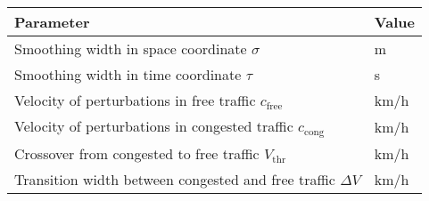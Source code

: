 \documentclass[portrait, a0, final]{a0poster}
\begin{document}
\sf
\normalsize
\begin{minipage}{35cm}
\textcolor{webfontcolor}{
\begin{tabular}{ll}
\toprule Parameter & Value\\ 
\midrule 
Smoothing width in space coordinate $\sigma$ & \unit[600]{m}\\ 
Smoothing width in time coordinate $\tau$ & \unit[40]{s} \\ 
Velocity of perturbations in free traffic $c_\text{free}$ & \unit[50]{km/h}\\
Velocity of perturbations in congested traffic $c_\text{cong}$ & \unit[-15]{km/h}\\
Crossover from congested to free traffic $V_\text{thr}$ & \unit[58]{km/h}\\
Transition width between congested and free traffic $\Delta V$ & \unit[5]{km/h}\\
\bottomrule
\end{tabular}
}
\end{minipage}
\end{document}
